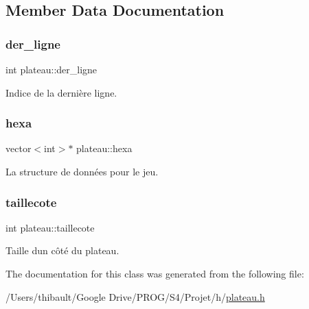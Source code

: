 \subsection{Member Data Documentation}
\mbox{\label{classplateau_a3ed9526208bf28f0063bdf7c0efb9391}} 
\subsubsection{\texorpdfstring{der\+\_\+ligne}{der\_ligne}}
{\footnotesize\ttfamily int plateau\+::der\+\_\+ligne\hspace{0.3cm}{\ttfamily [private]}}



Indice de la dernière ligne. 

\mbox{\label{classplateau_a1cf99c526864d850ffe97f5507ab1bcb}} 
\subsubsection{\texorpdfstring{hexa}{hexa}}
{\footnotesize\ttfamily vector$<$int$>$$\ast$ plateau\+::hexa\hspace{0.3cm}{\ttfamily [private]}}



La structure de données pour le jeu. 

\mbox{\label{classplateau_a3a22c0369525080629eba2ac2edab03e}} 
\subsubsection{\texorpdfstring{taillecote}{taillecote}}
{\footnotesize\ttfamily int plateau\+::taillecote\hspace{0.3cm}{\ttfamily [private]}}



Taille d\textquotesingle{}un côté du plateau. 



The documentation for this class was generated from the following file\+:\begin{DoxyCompactItemize}
\item 
/\+Users/thibault/\+Google Drive/\+P\+R\+O\+G/\+S4/\+Projet/h/\hyperlink{plateau_8h}{plateau.\+h}\end{DoxyCompactItemize}
